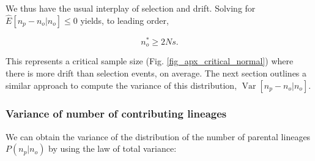 \documentclass[review,nonatbib]{elsarticle}
\begin{document}
We thus have the usual interplay of selection and drift. Solving for $ \hat{E}[n_p -n_o | n_o]\leq0$
yields, to leading order,

\begin{equation}
  \label{eq_critical_sample}
  n_o^* \ge 2N s.
\end{equation}

This represents a critical sample size (Fig.
\ref{fig_apx_critical_normal}) where there is more drift than selection events, on average.
The next section outlines a similar approach to compute the variance of this distribution, $\operatorname{Var}[n_p-n_o | n_o].$

\subsubsection{Variance of number of contributing lineages}
\label{subsec_apx_variance}

We can obtain the variance of the distribution of the number of parental lineages $P(n_p | n_o)$ by using the law of total variance:
\end{document}
